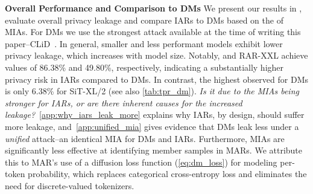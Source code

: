 \textbf{Overall Performance and Comparison to DMs}  
We present our results in , evaluate overall privacy leakage and compare IARs to DMs based on the \tprat of MIAs. For DMs we use the strongest attack available at the time of writing this paper--CLiD~\citep{zhai2024clid}. In general, smaller and less performant models exhibit lower privacy leakage, which increases with model size. Notably, \varbig and RAR-XXL achieve \tprat values of 86.38\% and 49.80\%, respectively, indicating a substantially higher privacy risk in IARs compared to DMs. In contrast, the highest \tprat observed for DMs is only 6.38\% for SiT-XL/2 (see also \cref{tab:tpr_dm}). \textit{Is it due to the MIAs being stronger for IARs, or are there inherent causes for the increased leakage?}~\cref{app:why_iars_leak_more} explains why IARs, by design, should suffer more leakage, and~\cref{app:unified_mia} gives evidence that DMs leak less under a \textit{unified} attack--an identical MIA for DMs and IARs. Furthermore, MIAs are significantly less effective at identifying member samples in MARs. We attribute this to MAR’s use of a diffusion loss function (\cref{eq:dm_loss}) for modeling per-token probability, which replaces categorical cross-entropy loss and eliminates the need for discrete-valued tokenizers.











